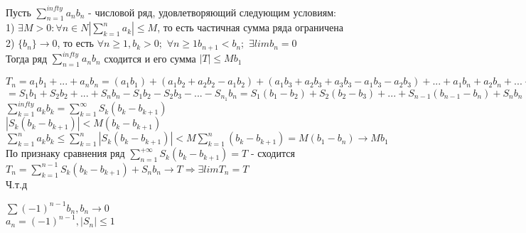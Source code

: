 \begin{Th}
	Пусть $\sum^{infty}_{n=1}a_nb_n$ - числовой ряд, удовлетворяющий следующим условиям:\\
	1) $\exists M > 0 : \forall n \in N |\sum^n_{k=1}a_k| \leq M$, то есть частичная сумма ряда ограничена\\
	2) $\{b_n\} \rightarrow 0$, то есть $\forall n \geq 1, b_k > 0;$ $\forall n \geq 1 b_{n+1} < b_n;$ $\exists lim b_n = 0$\\
	Тогда ряд $\sum^{infty}_{n=1}a_nb_n$ сходится и его сумма $|T| \leq Mb_1$\\
\end{Th}

\begin{Proof}
	$T_n = a_1b_1 + ... + a_nb_n = (a_1b_1) + (a_1b_2 + a_2b_2 - a_1b_2) + (a_1b_3 + a_2b_3 + a_3b_3 - a_1b_3 - a_2b_3) + ... + a_1b_n + a_2b_n + ... + a_nb_n - a_1b_n - a_2 b_n - ... - a_{n_1}b_n = $\\
	$ = S_1b_1 + S_2b_2 + ... + S_nb_n - S_1b_2 - S_2b_3 - ... - S_{n_1}b_n = S_1(b_1-b_2) + S_2(b_2 - b_3) + ... + S_{n-1}(b_{n-1} - b_n) + S_nb_n$\\
	$\sum^{infty}_{k=1}a_kb_k = \sum^{\infty}_{k=1} S_k(b_k - b_{k+1})$\\
	$|S_k(b_k - b_{k+1})| < M(b_k - b_{k+1})$\\
	$\sum^{n}_{k=1}a_kb_k \leq \sum^{n}_{k=1} |S_k(b_k - b_{k+1})| < M\sum^{n}_{k=1}(b_k - b_{k+1}) = M(b_1 - b_n) \rightarrow Mb_1$\\
	По признаку сравнения ряд $\sum^{+\infty}_{n=1}S_k(b_k - b_{k+1}) = T$ - сходится\\
	$T_n = \sum^{n-1}_{k=1} S_k(b_k - b_{k+1}) + S_nb_n \rightarrow T \Rightarrow \exists limT_n = T$\\
	Ч.т.д\\
\end{Proof}

\begin{Note}
	$\sum (-1)^{n-1}b_n, b_n \rightarrow 0$\\
	$a_n = (-1)^{n-1}, |S_n| \leq 1$
\end{Note}

